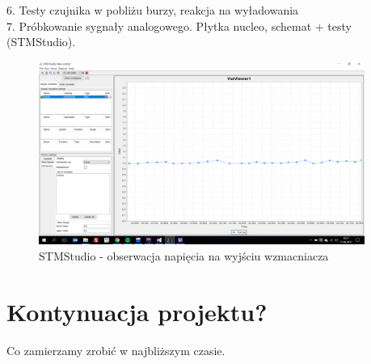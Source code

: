 \documentclass[12pt]{article}
\begin{document}
6. Testy czujnika w pobliżu burzy, reakcja na wyładowania\\
7. Próbkowanie sygnały analogowego. Płytka nucleo, schemat + testy (STMStudio).\\
\begin{figure}[H]
\begin{center}
\includegraphics[width=0.95\textwidth]{figures/stmstudio.png}
\caption{STMStudio - obserwacja napięcia na wyjściu wzmacniacza}
\end{center}
\end{figure}

\section{Kontynuacja projektu?}
Co zamierzamy zrobić w najbliższym czasie.
\end{document}
